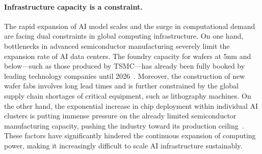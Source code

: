 \paragraph{Infrastructure capacity is a constraint.}
The rapid expansion of AI model scales and the surge in computational demand are facing dual constraints in global computing infrastructure. On one hand, bottlenecks in advanced semiconductor manufacturing severely limit the expansion rate of AI data centers. The foundry capacity for wafers at 5nm and below—such as those produced by TSMC—has already been fully booked by leading technology companies until 2026~\cite{benzinga2024tsmc}. Moreover, the construction of new wafer fabs involves long lead times and is further constrained by the global supply chain shortages of critical equipment, such as lithography machines.
On the other hand, the exponential increase in chip deployment within individual AI clusters is putting immense pressure on the already limited semiconductor manufacturing capacity, pushing the industry toward its production ceiling~\cite{scaleflux2024ai}.
These factors have significantly hindered the continuous expansion of computing power, making it increasingly difficult to scale AI infrastructure sustainably.



